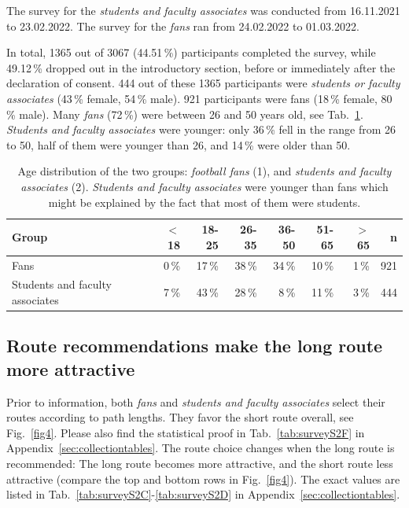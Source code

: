The  survey for the \textit{students and faculty associates} was conducted from 16.11.2021 to 23.02.2022. The survey for the \textit{fans} ran from 24.02.2022 to 01.03.2022.

In total, 1365 out of 3067 (44.51\,\%) participants completed the survey, while  49.12\,\% dropped out in the introductory section, before or immediately after the declaration of consent.
444 out of these 1365 participants were \textit{students or faculty associates} (43\,\% female, 54\,\% male). 921 participants were fans (18\,\% female, 80\,\% male).
Many \textit{fans} (72\,\%) were between 26 and 50 years old, see Tab.~\ref{tab1}.  \textit{Students and faculty associates} were younger: only 36\,\% fell in the range from 26 to 50, half of them were younger than 26, and 14\,\% were older than 50. 
% 


\begin{table}[ht!]
\begin{tabular}{|l|r|r|r|r|r|r|r|}
  \hline
Group & $<$18 & 18-25 & 26-35 & 36-50 & 51-65 & $>$65 & n \\ 
  \hline
Fans & 0\,\% & 17\,\% & 38\,\% & 34\,\% & 10\,\% & 1\,\% & 921 \\ \hline
  Students and faculty associates & 7\,\% & 43\,\% & 28\,\% & 8\,\% & 11\,\% & 3\,\% & 444 \\ 
   \hline
\end{tabular}
\caption[Age distribution of the two groups]{ Age distribution of the two groups: \textit{football fans} (1), and \textit{students and faculty associates} (2). \textit{Students and faculty associates} were younger than fans which might be explained by the fact that most of them were students.}
\label{tab1}
\end{table}





\subsection{Route recommendations make the long route more attractive}
Prior to information, both \textit{fans} and \textit{students and faculty associates} select their routes according to path lengths. They favor the short route overall, see Fig.~\ref{fig4}. Please also find the statistical proof in Tab.~\ref{tab:surveyS2F} in Appendix~\ref{sec:collectiontables}.
The route choice changes when the long route is recommended: The long route becomes more attractive, and the short route less attractive (compare the top and bottom rows in Fig.~\ref{fig4}). The exact values are listed in Tab.~\ref{tab:surveyS2C}-\ref{tab:surveyS2D} in Appendix~\ref{sec:collectiontables}.  


